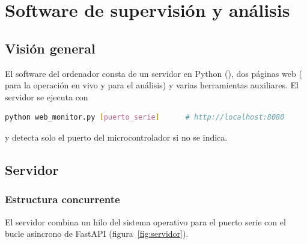 \chapter{Software de supervisión y análisis}
\label{chap:software}

\section{Visión general}

El software del ordenador consta de un servidor en Python (), dos páginas
web ( para la operación en vivo y  para el
análisis) y varias herramientas auxiliares. El servidor se ejecuta con

\begin{lstlisting}[language=bash,numbers=none]
python web_monitor.py [puerto_serie]      # http://localhost:8080
\end{lstlisting}

y detecta solo el puerto del microcontrolador si no se indica.

\section{Servidor}

\subsection{Estructura concurrente}

El servidor combina un hilo del sistema operativo para el puerto serie con el bucle asíncrono de
FastAPI (figura~\ref{fig:servidor}).

